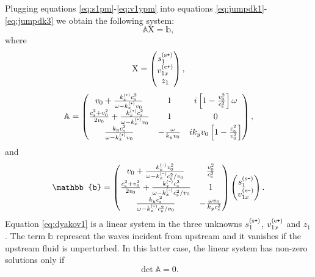\documentclass[useAMS,usenatbib]{mn2e}
\def\Plus{\texttt{+}}
\def\Minus{\texttt{-}}
\begin{document}
Plugging equations \eqref{eq:s1pm}-\eqref{eq:v1ypm} into equations \eqref{eq:jumpdk1}-\eqref{eq:jumpdk3} we obtain the following system:
\begin{equation}
\mathbb{A} \mathbf{\mathrm{X}} = \mathbb{b}, \label{eq:dyakov1}
\end{equation}
where 
\begin{equation}
\mathbf{\mathrm{X}} =  \begin{pmatrix}  s_1 ^{(\rm s \Plus)} \\ v_{1x}^{(\rm e \Plus)}  \\ z_1 \end{pmatrix},
\end{equation}
%
\begin{equation}
\mathbb{A} =  \begin{pmatrix} v_0 + \frac{k_x^{(\Plus)} \cs^2}{\omega - k_x^{(\Plus)} v_0} & 1 & i \left[1 - \frac{v_0^2}{\cs^2}\right] \omega \\ \frac{\cs^2+v_0^2}{2 v_0} + \frac{k_x^{(\Plus)} \cs^2}{\omega - k_x^{(\Plus)} v_0} & 1 & 0 \\ \frac{k_y \cs^2}{\omega - k_x^{(\Plus)} v_0} & -\frac{\omega}{k_y v_0} & i k_y v_0 \left[ 1 - \frac{\cs^2}{v_0^2}\right] \end{pmatrix} ,
\end{equation}
%
and
\begin{equation} \label{eq:dyakov}
 \mathbb{b}  =  \begin{pmatrix} v_0 + \frac{k_x^{(\Minus)} v_0^2}{\omega - k_x^{(\Minus)} \cs^2/v_0} & \frac{v_0^2}{\cs^2} \\  \frac{\cs^2+v_0^2}{2 v_0} + \frac{k_x^{(\Minus)} \cs^2}{\omega - k_x^{(\Minus)} \cs^2/v_0} & 1 \\ \frac{k_y \cs^2}{\omega - k_x^{(\Minus)} \cs^2/v_0} & -\frac{\omega v_0}{k_y \cs^2}\end{pmatrix} 
  \begin{pmatrix}  s_1 ^{(\rm s \Minus)} \\ v_{1x}^{(\rm e \Minus)}  \end{pmatrix} .
\end{equation}
Equation \eqref{eq:dyakov1} is a linear system in the three unknowns $s_1 ^{(\rm s \Plus)}$, $v_{1x}^{(\rm e \Plus)}$ and $z_1$. The term $\mathbb{b}$ represent the waves incident from upstream and it vanishes if the upstream fluid is unperturbed. In this latter case, the linear system has non-zero solutions only if
\begin{equation}
\det \mathbb{A} = 0. \label{eq:detA}
\end{equation}
\end{document}
